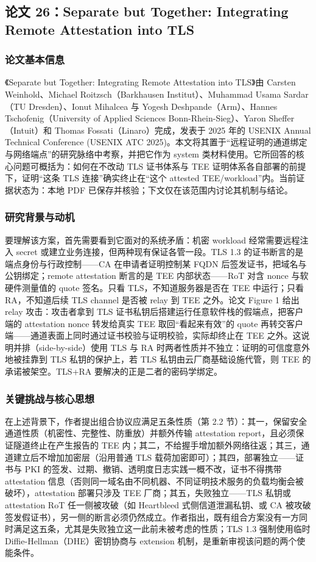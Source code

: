 \documentclass[11pt]{ctexart}
\begin{document}
\subsection{论文 26：Separate but Together: Integrating Remote Attestation into TLS}
\subsubsection{论文基本信息}
《Separate but Together: Integrating Remote Attestation into TLS》由 Carsten Weinhold、Michael Roitzsch（Barkhausen Institut）、Muhammad Usama Sardar（TU Dresden）、Ionut Mihalcea 与 Yogesh Deshpande（Arm）、Hannes Tschofenig（University of Applied Sciences Bonn-Rhein-Sieg）、Yaron Sheffer（Intuit）和 Thomas Fossati（Linaro）完成，发表于 2025 年的 USENIX Annual Technical Conference (USENIX ATC 2025)。本文将其置于“远程证明的通道绑定与网络端点”的研究脉络中考察，并把它作为 system 类材料使用。它所回答的核心问题可概括为：如何在不改动 TLS 证书体系与 TEE 证明体系各自部署的前提下，证明“这条 TLS 连接”确实终止在“这个 attested TEE/workload”内。当前证据状态为：本地 PDF 已保存并核验；下文仅在该范围内讨论其机制与结论。\cite{weinhold2025tlsra}\par
\subsubsection{研究背景与动机}
要理解该方案，首先需要看到它面对的系统矛盾：机密 workload 经常需要远程注入 secret 或建立业务连接，但两种现有保证各管一段。TLS 1.3 的证书断言的是端点身份与行政控制——CA 在申请者证明控制某 FQDN 后签发证书，把域名与公钥绑定；remote attestation 断言的是 TEE 内部状态——RoT 对含 nonce 与软硬件测量值的 quote 签名。只看 TLS，不知道服务器是否在 TEE 中运行；只看 RA，不知道后续 TLS channel 是否被 relay 到 TEE 之外。论文 Figure 1 给出 relay 攻击：攻击者拿到 TLS 证书私钥后搭建运行任意软件栈的假端点，把客户端的 attestation nonce 转发给真实 TEE 取回“看起来有效”的 quote 再转交客户端——通道表面上同时通过证书校验与证明校验，实际却终止在 TEE 之外。这说明并排（side-by-side）使用 TLS 与 RA 时两者性质并不独立：证明的可信度意外地被挂靠到 TLS 私钥的保护上，若 TLS 私钥由云厂商基础设施代管，则 TEE 的承诺被架空。TLS+RA 要解决的正是二者的密码学绑定。\par
\subsubsection{关键挑战与核心思想}
在上述背景下，作者提出组合协议应满足五条性质（第 2.2 节）：其一，保留安全通道性质（机密性、完整性、防重放）并额外传输 attestation report，且必须保证隧道终止在产生报告的 TEE 内；其二，不给握手增加额外网络往返；其三，通道建立后不增加加密层（沿用普通 TLS 载荷加密即可）；其四，部署独立——证书与 PKI 的签发、过期、撤销、透明度日志实践一概不改，证书不得携带 attestation 信息（否则同一域名由不同机器、不同证明技术服务的负载均衡会被破坏），attestation 部署只涉及 TEE 厂商；其五，失败独立——TLS 私钥或 attestation RoT 任一侧被攻破（如 Heartbleed 式侧信道泄漏私钥、或 CA 被攻破签发假证书），另一侧的断言必须仍然成立。作者指出，既有组合方案没有一方同时满足这五条，尤其是失败独立这一此前未被考虑的性质；TLS 1.3 强制使用临时 Diffie-Hellman（DHE）密钥协商与 extension 机制，是重新审视该问题的两个使能条件。\par
\end{document}
